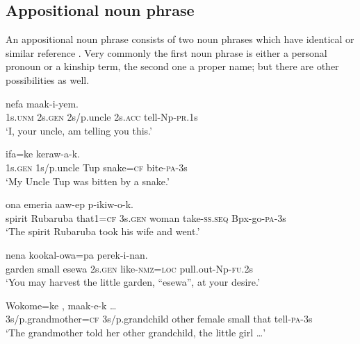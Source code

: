 \subsection{Appositional noun phrase} \label{sec:4.1.4}
{}
An appositional noun phrase consists of two noun phrases which have identical or similar reference \citep[24]{Crystal1997}.  Very commonly the first noun phrase is either a personal pronoun or a kinship term, the second one a proper name; but there are other possibilities as well.  

\ea%
\label{ex:4:x835}
\gll {}    nefa  maak-i-yem. \\
  1s.\textsc{unm}  2s.\textsc{gen}  2s/p.uncle  2s.\textsc{acc}  tell-Np-\textsc{pr}.1s    \\
\glt`I, your uncle, am telling you this.'
\z

\ea%
\label{ex:4:x836}
\gll {}    ifa=ke  keraw-a-k. \\
  1s.\textsc{gen}  1s/p.uncle  Tup  snake=\textsc{cf}  bite-\textsc{pa}-3s    \\
\glt`My Uncle Tup was bitten by a snake.'
\z

\ea%
\label{ex:4:x837}
\gll {}     ona  emeria  aaw-ep  p-ikiw-o-k.\\
    spirit  Rubaruba  that1=\textsc{cf}  3s.\textsc{gen}  woman  take-\textsc{ss}.\textsc{seq}  Bpx-go-\textsc{pa}-3s  \\
\glt`The spirit Rubaruba took his wife and went.'
\z

\ea%
\label{ex:4:x838}
\gll {}     nena  kookal-owa=pa  perek-i-nan.\\
garden  small  esewa  2s.\textsc{gen}  like-\textsc{nmz}=\textsc{loc}   pull.out-Np-\textsc{fu}.2s     \\
\glt`You may harvest the little garden, ``esewa'', at your desire.'
\z

\ea%
\label{ex:4:x839}
\gll Wokome=ke   ,      maak-e-k  {\dots}\\
    3s/p.grandmother=\textsc{cf}  3s/p.grandchild  other  female  small  that  tell-\textsc{pa}-3s  \\
\glt`The grandmother told her other grandchild, the little girl {\dots}'
\z

